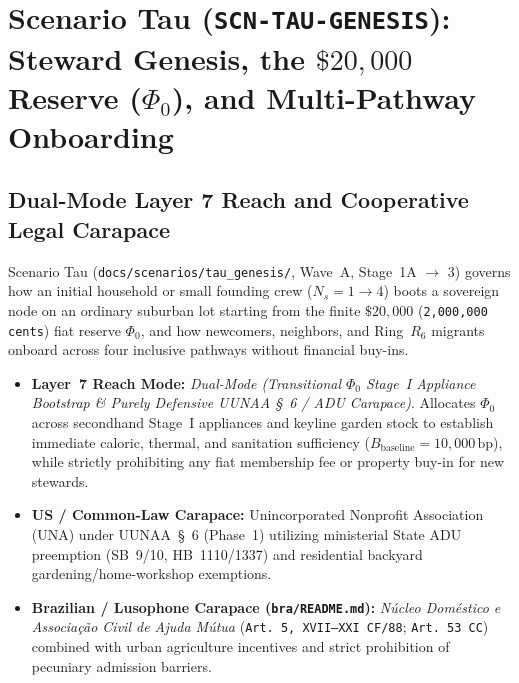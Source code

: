 \chapter{Scenario Tau (\texttt{SCN-TAU-GENESIS}): Steward Genesis, the $\$20{,}000$ Reserve (\texorpdfstring{$\Phi_0$}{Phi\_0}), and Multi-Pathway Onboarding}
\label{app:scenario-tau}

\section{Dual-Mode Layer 7 Reach and Cooperative Legal Carapace}
Scenario Tau (\texttt{docs/scenarios/tau\_genesis/}, Wave~A, Stage~1A $\to$ 3) governs how an initial household or small founding crew ($N_s = 1 \to 4$) boots a sovereign node on an ordinary suburban lot starting from the finite $\$20{,}000$ (\texttt{2,000,000 cents}) fiat reserve $\Phi_0$, and how newcomers, neighbors, and Ring~$R_6$ migrants onboard across four inclusive pathways without financial buy-ins.
\begin{itemize}
    \item \textbf{Layer~7 Reach Mode:} \textit{Dual-Mode (Transitional $\Phi_0$ Stage~I Appliance Bootstrap \& Purely Defensive UUNAA \S~6 / ADU Carapace)}. Allocates $\Phi_0$ across secondhand Stage~I appliances and keyline garden stock to establish immediate caloric, thermal, and sanitation sufficiency ($B_{\mathrm{baseline}} = 10{,}000\,\mathrm{bp}$), while strictly prohibiting any fiat membership fee or property buy-in for new stewards.
    \item \textbf{US / Common-Law Carapace:} Unincorporated Nonprofit Association (UNA) under UUNAA~\S~6 (Phase~1) utilizing ministerial State ADU preemption (SB~9/10, HB~1110/1337) and residential backyard gardening/home-workshop exemptions.
    \item \textbf{Brazilian / Lusophone Carapace (\texttt{bra/README.md}):} \textit{N{\'u}cleo Dom{\'e}stico e Associa{\c{c}}{\~a}o Civil de Ajuda M{\'u}tua} (\texttt{Art.~5{\textordmasculine}, XVII--XXI CF/88}; \texttt{Art.~53 CC}) combined with urban agriculture incentives and strict prohibition of pecuniary admission barriers.
\end{itemize}

